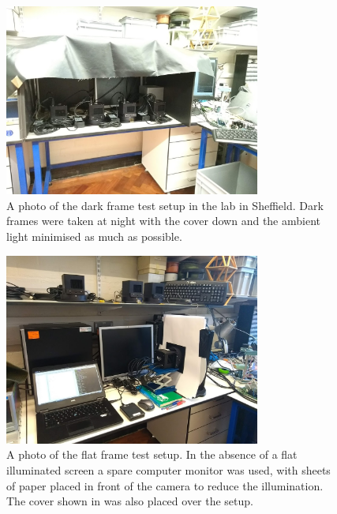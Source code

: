 \begin{colsection}
\begin{colsection}
\begin{figure}[p]
    \begin{center}
        \includegraphics[width=0.75\textwidth]{images/dark_photo.jpg}
    \end{center}
    \caption[The dark frame test setup]{
        A photo of the dark frame test setup in the lab in Sheffield. Dark frames were taken at night with the cover down and the ambient light minimised as much as possible.
        }\label{fig:dark_photo}
\end{figure}

\begin{figure}[p]
    \begin{center}
        \includegraphics[width=0.75\textwidth]{images/flat_photo.jpg}
    \end{center}
    \caption[The flat frame test setup]{
        A photo of the flat frame test setup. In the absence of a flat illuminated screen a spare computer monitor was used, with sheets of paper placed in front of the camera to reduce the illumination. The cover shown in  was also placed over the setup.
        }\label{fig:flat_photo}
\end{figure}


\end{colsection}
\end{colsection}
